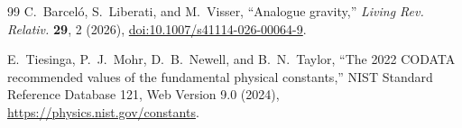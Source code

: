 \documentclass[aps,pre,preprint,notitlepage,nofootinbib,superscriptaddress]{revtex4-2}
\begin{document}
\begin{thebibliography}{99}
C.~Barcel\'o, S.~Liberati, and M.~Visser,
``Analogue gravity,''
\emph{Living Rev. Relativ.} \textbf{29}, 2 (2026),
\href{https://doi.org/10.1007/s41114-026-00064-9}{doi:10.1007/s41114-026-00064-9}.

E.~Tiesinga, P.~J.~Mohr, D.~B.~Newell, and B.~N.~Taylor,
``The 2022 CODATA recommended values of the fundamental physical constants,''
NIST Standard Reference Database 121, Web Version 9.0 (2024),
\url{https://physics.nist.gov/constants}.

\end{thebibliography}
\end{document}

